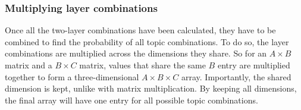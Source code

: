 \subsubsection{Multiplying layer combinations}\label{app:multiply_layer_combs}
Once all the two-layer combinations have been calculated, they have to be combined to find the probability of all topic combinations.
To do so, the layer combinations are multiplied across the dimensions they share.
So for an $A\times B$ matrix and a $B\times C$ matrix, values that share the same $B$ entry are multiplied together to form a three-dimensional $A\times B\times C$ array.
Importantly, the shared dimension is kept, unlike with matrix multiplication.
By keeping all dimensions, the final array will have one entry for all possible topic combinations.
